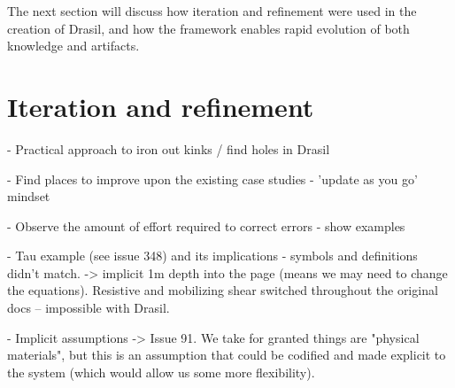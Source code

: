 The next section will discuss how iteration and refinement were used in the 
creation of Drasil, and how the framework enables rapid evolution of both 
knowledge and artifacts.

\section{Iteration and refinement}
\label{sec:iterefine}

  - Practical approach to iron out kinks / find holes in Drasil

  - Find places to improve upon the existing case studies - 'update as you go' 
  mindset

  - Observe the amount of effort required to correct errors - show examples

  - Tau example (see issue 348) and its implications - symbols and definitions 
  didn't match. -> implicit 1m depth into the page (means we may need to change 
  the equations). Resistive and mobilizing shear switched throughout the 
  original docs -- impossible with Drasil.

  -  Implicit assumptions -> 
  Issue 91. We take for granted things are "physical 
  materials", but this is an assumption that could be codified and made 
  explicit to the system (which would allow us some more flexibility).